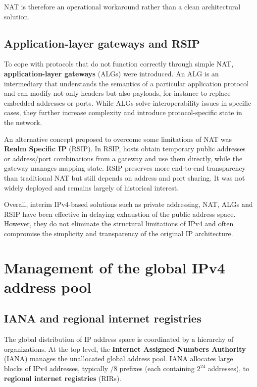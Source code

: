 NAT is therefore an operational workaround rather than a clean architectural solution.

\subsection{Application-layer gateways and RSIP}

To cope with protocols that do not function correctly through simple NAT, \textbf{application-layer gateways} (ALGs) were introduced. An ALG is an intermediary that understands the semantics of a particular application protocol and can modify not only headers but also payloads, for instance to replace embedded addresses or ports. While ALGs solve interoperability issues in specific cases, they further increase complexity and introduce protocol-specific state in the network.

An alternative concept proposed to overcome some limitations of NAT was \textbf{Realm Specific IP} (RSIP). In RSIP, hosts obtain temporary public addresses or address/port combinations from a gateway and use them directly, while the gateway manages mapping state. RSIP preserves more end-to-end transparency than traditional NAT but still depends on address and port sharing. It was not widely deployed and remains largely of historical interest.

Overall, interim IPv4-based solutions such as private addressing, NAT, ALGs and RSIP have been effective in delaying exhaustion of the public address space. However, they do not eliminate the structural limitations of IPv4 and often compromise the simplicity and transparency of the original IP architecture.

\section{Management of the global IPv4 address pool}

\subsection{IANA and regional internet registries}

The global distribution of IP address space is coordinated by a hierarchy of organizations. At the top level, the \textbf{Internet Assigned Numbers Authority} (IANA) manages the unallocated global address pool. IANA allocates large blocks of IPv4 addresses, typically /8 prefixes (each containing $2^{24}$ addresses), to \textbf{regional internet registries} (RIRs).

